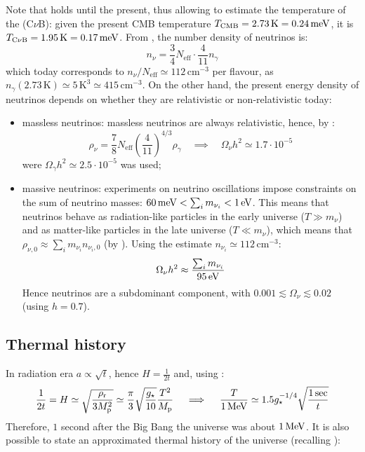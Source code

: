 Note that  holds until the present, thus allowing to estimate the temperature of the  (C$ \nu $B): given the present CMB temperature $ T_\text{CMB} = 2.73 \,\text{K} = 0.24 \,\mathrm{meV} $, it is $ T_\text{C$ \nu $B} = 1.95 \,\text{K} = 0.17 \,\mathrm{meV} $. From , the number density of neutrinos is:
\begin{equation}
  n_\nu = \frac{3}{4} N_\text{eff} \cdot \frac{4}{11} n_\gamma
\end{equation}
which today corresponds to $ n_\nu / N_\text{eff} \simeq 112 \,\text{cm}^{-3} $ per flavour, as $ n_\gamma(2.73 \,\text{K}) \simeq 5 \,\text{K}^3 \simeq 415 \,\text{cm}^{-3} $. On the other hand, the present energy density of neutrinos depends on whether they are relativistic or non-relativistic today:
\begin{itemize}
  \item massless neutrinos: massless neutrinos are always relativistic, hence, by :
    \begin{equation*}
      \rho_\nu = \frac{7}{8} N_\text{eff} \left( \frac{4}{11} \right)^{4/3} \rho_\gamma \quad \implies \quad \Omega_\nu h^2 \simeq 1.7 \cdot 10^{-5}
    \end{equation*}
    were $ \Omega_\gamma h^2 \simeq 2.5 \cdot 10^{-5} $ was used;
  \item massive neutrinos: experiments on neutrino oscillations impose constraints on the sum of neutrino masses: $ 60 \,\mathrm{meV} < \sum_i m_{\nu_i} < 1 \,\mathrm{eV} $. This means that neutrinos behave as radiation-like particles in the early universe ($ T \gg m_\nu $) and as matter-like particles in the late universe ($ T \ll m_\nu $), which means that $ \rho_{\nu,0} \approx \sum_i m_{\nu_i} n_{\nu_i , 0} $ (by ). Using the estimate $ n_{\nu_i} \simeq 112 \,\text{cm}^{-3} $:
    \begin{equation}
      \Omega_\nu h^2 \approx \frac{\sum_i m_{\nu_i}}{95 \,\mathrm{eV}}
    \end{equation}
    Hence neutrinos are a subdominant component, with $ 0.001 \lesssim \Omega_\nu \lesssim 0.02 $ (using $ h = 0.7 $).
\end{itemize}

\subsection{Thermal history}

In radiation era $ a \propto \sqrt{t} $, hence $ H = \frac{1}{2t} $ and, using :
\begin{equation}
  \frac{1}{2t} = H \simeq \sqrt{\frac{\rho_\text{r}}{3M_\text{p}^2}} \simeq \frac{\pi}{3} \sqrt{\frac{g_\star}{10}} \frac{T^2}{M_\text{p}}
  \quad \implies \quad
  \frac{T}{1 \,\mathrm{MeV}} \simeq 1.5 g_\star^{-1/4} \sqrt{\frac{1 \,\text{sec}}{t}}
  \label{eq:thermal-history}
\end{equation}
Therefore, $ 1 $ second after the Big Bang the universe was about $ 1 \,\mathrm{MeV} $. It is also possible to state an approximated thermal history of the universe (recalling ):

